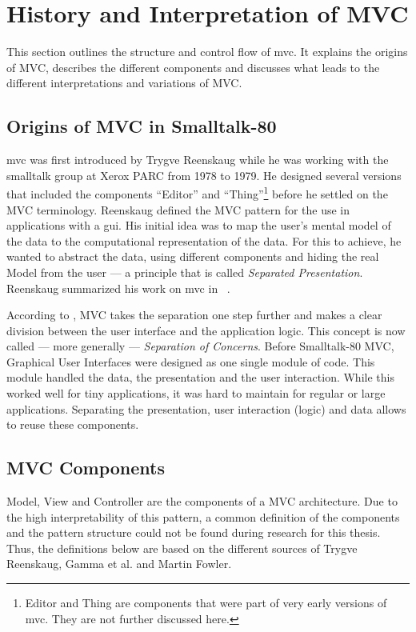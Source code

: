 \section{History and Interpretation of MVC}
This section outlines the structure and control flow of \acl{mvc}. It explains the origins of MVC, describes the different components and discusses what leads to the different interpretations and variations of MVC.

\subsection{Origins of MVC in Smalltalk-80}
\acl{mvc} was first introduced by Trygve Reenskaug while he was working with the \gls{smalltalk} group at Xerox PARC from 1978 to 1979. He designed several versions that included the components ``Editor'' and ``Thing''\footnote{Editor and Thing are components that were part of very early versions of \ac{mvc}. They are not further discussed here.} before he settled on the MVC terminology. Reenskaug defined the MVC pattern for the use in applications with a \ac{gui}. His initial idea was to map the user's mental model of the data to the computational representation of the data. For this to achieve, he wanted to abstract the data, using different components and hiding the real Model from the user --- a principle that is called \emph{Separated Presentation}. Reenskaug summarized his work on \gls{mvc} in ~\citeyear{reenskaug03}.

According to , MVC takes the separation one step further and makes a clear division between the user interface and the application logic. This concept is now called --- more generally --- \emph{Separation of Concerns}. Before Smalltalk-80 MVC, Graphical User Interfaces were designed as one single module of code. This module handled the data, the presentation and the user interaction. While this worked well for tiny applications, it was hard to maintain for regular or large applications. Separating the presentation, user interaction (logic) and data allows to reuse these components.

\subsection{MVC Components}
Model, View and Controller are the components of a MVC architecture. Due to the high interpretability of this pattern, a common definition of the components and the pattern structure could not be found during research for this thesis. Thus, the definitions below are based on the different sources of Trygve Reenskaug, Gamma et al. and Martin Fowler.


